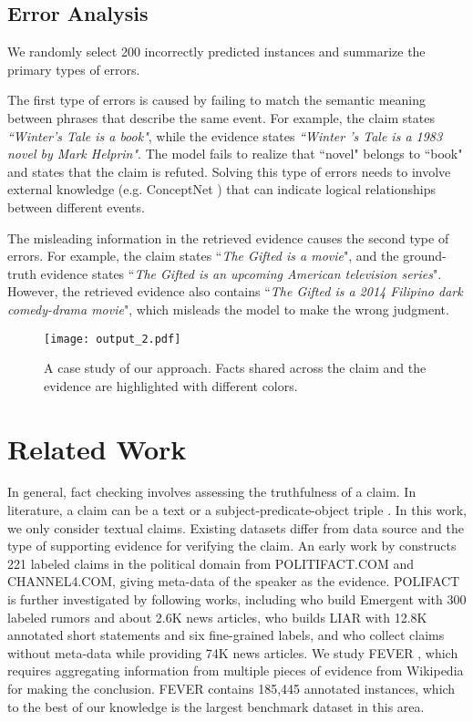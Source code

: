 \documentclass[11pt,a4paper]{article}
\begin{document}
\subsection{Error Analysis}
We randomly select 200 incorrectly predicted instances and summarize the primary types of errors.
\par
The first type of errors is caused by failing to match the semantic meaning between phrases that describe the same event. For example, the claim states \textit{``Winter's Tale is a book"}, while the evidence states \textit{``Winter 's Tale is a 1983 novel by Mark Helprin"}. The model fails to realize that ``novel" belongs to ``book" and states that the claim is refuted. Solving this type of errors needs to involve external knowledge (e.g. ConceptNet \cite{speer2017conceptnet}) that can indicate logical relationships between different events.
\par
The misleading information in the retrieved evidence causes the second type of errors. 
For example, the claim states ``\textit{The Gifted is a movie}", and the ground-truth evidence states ``\textit{The Gifted is an upcoming American television series}". However, the retrieved evidence also contains ``\textit{The Gifted is a 2014 Filipino dark comedy-drama movie}", which misleads the model to make the wrong judgment.


\begin{figure}[t]
	\texttt{[image: output\_2.pdf]}
	\caption{A case study of our approach. Facts shared across the claim and the evidence are highlighted with different colors.}
	\label{fig:model-output}
\end{figure}
\section{Related Work}


In general, fact checking involves assessing the truthfulness of a claim.
In literature, a claim can be a text or a 
subject-predicate-object triple \cite{nakashole2014language}.
In this work, we only consider textual claims.
Existing datasets differ from data source and the type of supporting evidence for verifying the claim.
An early work by  constructs 221 labeled claims in the political domain from POLITIFACT.COM and CHANNEL4.COM, giving meta-data of the speaker as the evidence.
POLIFACT is further investigated by following works, 
including  who build Emergent with 300 labeled rumors and about 2.6K news articles,
 who builds LIAR with 12.8K annotated short statements and six fine-grained labels, 
and 
 who collect claims without meta-data while providing 74K news articles.
We study FEVER \cite{thorne2018fever}, which requires aggregating information from multiple pieces of evidence from Wikipedia for making the conclusion. 
FEVER contains 185,445 annotated instances, which to the best of our knowledge is the largest benchmark dataset in this area. 
\end{document}
